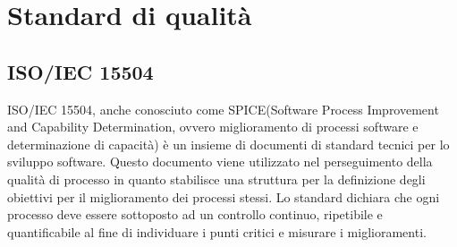 \newpage
\appendix
\section{Standard di qualità} %

\subsection{ISO/IEC 15504} %
ISO/IEC 15504, anche conosciuto come SPICE(Software Process Improvement and Capability Determination, ovvero miglioramento di processi software e determinazione di capacità) è un insieme di documenti di standard tecnici per lo sviluppo software.
Questo documento viene utilizzato nel perseguimento della qualità di processo in quanto stabilisce una struttura per la definizione degli obiettivi per il miglioramento dei processi stessi.
Lo standard dichiara che ogni processo deve essere sottoposto ad un controllo continuo, ripetibile e quantificabile al fine di individuare i punti critici e misurare i miglioramenti.


